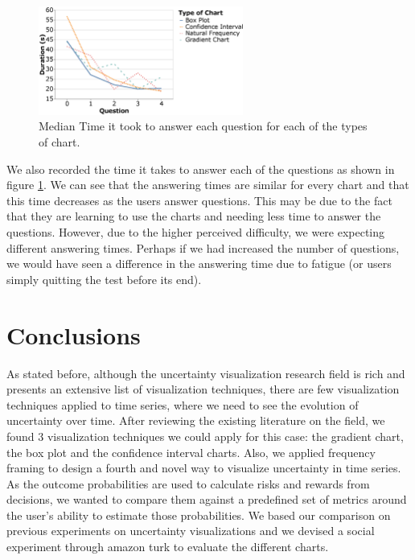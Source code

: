\documentclass[a4paper,3p,sort&compress]{elsarticle}
\begin{document}
\begin{figure}
  \centering
   \includegraphics[width=0.6\textwidth]{duration_evo2}
  \caption{\label{figure:duration} Median Time it took to answer each question for each of the types of chart.}
\end{figure}  

We also recorded the time it takes to answer each of the questions as shown in figure \ref{figure:duration}. We 
can see that the answering times are similar for every chart and that this time decreases as the users answer questions.
This may be due to the fact that they are learning to use the charts and needing less time to answer the questions.
However, due to the higher perceived difficulty, we were expecting different answering times. Perhaps if we had 
increased the number of questions, we would have seen a difference in the answering time due to fatigue (or users simply quitting the test 
before its end).


\section{Conclusions}
\label{sec:concl}

As stated before, although the uncertainty visualization research field is rich and presents an extensive list of visualization techniques, 
there are few 
visualization techniques applied to time series, where we need to see the evolution of uncertainty 
over time. After reviewing the existing literature on the field, we found 3 visualization techniques we could apply for this case:
the gradient chart, the box plot and the confidence interval charts. Also, we applied frequency framing 
to design a fourth and novel way to visualize uncertainty in time series.
As the outcome probabilities are used to calculate risks and rewards from decisions, we wanted to compare them against a predefined set of 
metrics around the user's ability to estimate those probabilities.
We based our comparison on previous experiments on uncertainty visualizations and we devised a social experiment through amazon turk to 
evaluate the different charts.
\end{document}
